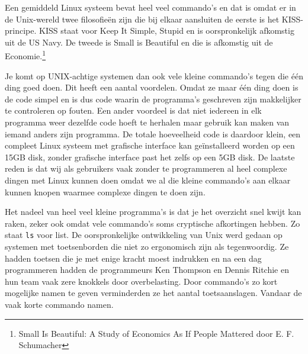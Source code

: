 Een gemiddeld Linux systeem bevat heel veel commando's en dat is omdat er in de Unix-wereld twee filosofie\"en zijn die bij elkaar aansluiten de eerste is het KISS-principe. KISS staat voor Keep It Simple, Stupid en is oorspronkelijk afkomstig uit de US Navy. De tweede is Small is Beautiful en die is afkomstig uit de Economie.\footnote{Small Is Beautiful: A Study of Economics As If People Mattered door E. F. Schumacher}

Je komt op UNIX-achtige systemen dan ook vele kleine commando's tegen die \'e\'en ding goed doen. Dit heeft een aantal voordelen. Omdat ze maar \'e\'en ding doen is de code simpel en is dus code waarin de programma's geschreven zijn makkelijker te controleren op fouten. Een ander voordeel is dat niet iedereen in elk programma weer dezelfde code hoeft te herhalen maar gebruik kan maken van iemand anders zijn programma. De totale hoeveelheid code is daardoor klein, een compleet Linux systeem met grafische interface kan ge\"installeerd worden op een 15GB disk, zonder grafische interface past het zelfs op een 5GB disk. De laatste reden is dat wij als gebruikers vaak zonder te programmeren al heel complexe dingen met Linux kunnen doen omdat we al die kleine commando's aan elkaar kunnen knopen waarmee complexe dingen te doen zijn.

Het nadeel van heel veel kleine programma's is dat je het overzicht snel kwijt kan raken, zeker ook omdat vele commando's soms cryptische afkortingen hebben. Zo staat \texttt{ls} voor list. De oorspronkelijke ontwikkeling van Unix werd gedaan op systemen met toetsenborden die niet zo ergonomisch zijn als tegenwoordig. Ze hadden toetsen die je met enige kracht moest indrukken en na een dag programmeren hadden de programmeurs Ken Thompson en Dennis Ritchie en hun team vaak zere knokkels door overbelasting. Door commando's zo kort mogelijke namen te geven verminderden ze het aantal toetsaanslagen. Vandaar de vaak korte commando namen.

